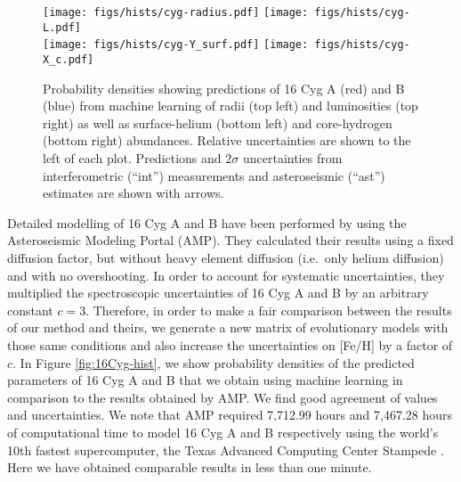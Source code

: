 \documentclass[manuscript]{aastex}
\begin{document}
\begin{figure*}
    \centering
    \texttt{[image: figs/hists/cyg-radius.pdf]}\hfill
    \texttt{[image: figs/hists/cyg-L.pdf]}\\
    \texttt{[image: figs/hists/cyg-Y\_surf.pdf]}\hfill
    \texttt{[image: figs/hists/cyg-X\_c.pdf]}\\
    \caption{Probability densities showing predictions of 16 Cyg A (red) and B (blue) from machine learning of radii (top left) and luminosities (top right) as well as surface-helium (bottom left) and core-hydrogen (bottom right) abundances. Relative uncertainties are shown to the left of each plot. Predictions and $2\sigma$ uncertainties from interferometric (``int'') measurements and asteroseismic (``ast'') estimates are shown with arrows.}
    \label{fig:interferometry}
\end{figure*}

Detailed modelling of 16 Cyg A and B have been performed  by \citet{2015ApJ...811L..37M} using the Asteroseismic Modeling Portal (AMP). They calculated their results using a fixed diffusion factor, but without heavy element diffusion (i.e.~only helium diffusion) and with no overshooting. In order to account for systematic uncertainties, they multiplied the spectroscopic uncertainties of 16 Cyg A and B by an arbitrary constant $c=3$. Therefore, in order to make a fair comparison between the results of our method and theirs, we generate a new matrix of evolutionary models with those same conditions and also increase the uncertainties on [Fe/H] by a factor of $c$. In Figure \ref{fig:16Cyg-hist}, we show probability densities of the predicted parameters of 16 Cyg A and B that we obtain using machine learning in comparison to the results obtained by AMP. We find good agreement of values and uncertainties. We note that AMP required 7,712.99 hours and 7,467.28 hours of computational time to model 16 Cyg A and B respectively using the world's 10th fastest supercomputer, the Texas Advanced Computing Center Stampede \citep{TOP500}. Here we have obtained comparable results in less than one minute. %
\end{document}
